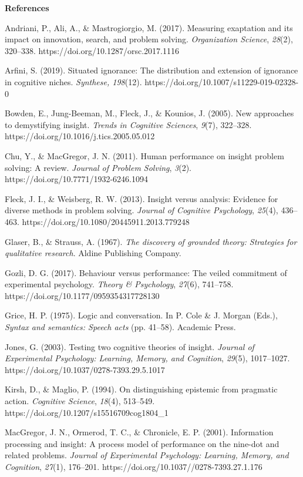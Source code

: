 \documentclass{article}
\begin{document}
\textbf{}

\textbf{References}

Andriani, P., Ali, A., \& Mastrogiorgio, M. (2017). Measuring exaptation and its impact on innovation, search, and problem solving. \emph{Organization Science}, \emph{28}(2), 320--338. https://doi.org/10.1287/orsc.2017.1116

Arfini, S. (2019). Situated ignorance: The distribution and extension of ignorance in cognitive niches. \emph{Synthese, 198}(12). https://doi.org/10.1007/s11229-019-02328-0

Bowden, E., Jung-Beeman, M., Fleck, J., \& Kounios, J. (2005). New approaches to demystifying insight. \emph{Trends in Cognitive Sciences}, \emph{9}(7), 322--328. https://doi.org/10.1016/j.tics.2005.05.012

Chu, Y., \& MacGregor, J. N. (2011). Human performance on insight problem solving: A review. \emph{Journal of Problem Solving}, \emph{3}(2). https://doi.org/10.7771/1932-6246.1094

Fleck, J. I., \& Weisberg, R. W. (2013). Insight versus analysis: Evidence for diverse methods in problem solving. \emph{Journal of Cognitive Psychology}, \emph{25}(4), 436--463. https://doi.org/10.1080/20445911.2013.779248

Glaser, B., \& Strauss, A. (1967). \emph{The discovery of grounded theory: Strategies for qualitative research}. Aldine Publishing Company.

Gozli, D. G. (2017). Behaviour versus performance: The veiled commitment of experimental psychology. \emph{Theory \& Psychology}, \emph{27}(6), 741--758. https://doi.org/10.1177/0959354317728130

Grice, H. P. (1975). Logic and conversation. In P. Cole \& J. Morgan (Eds.), \emph{Syntax and semantics: Speech acts} (pp. 41--58). Academic Press.

Jones, G. (2003). Testing two cognitive theories of insight. \emph{Journal of Experimental Psychology: Learning, Memory, and Cognition}, \emph{29}(5), 1017--1027. https://doi.org/10.1037/0278-7393.29.5.1017

Kirsh, D., \& Maglio, P. (1994). On distinguishing epistemic from pragmatic action. \emph{Cognitive Science}, \emph{18}(4), 513--549. https://doi.org/10.1207/s15516709cog1804\_1

MacGregor, J. N., Ormerod, T. C., \& Chronicle, E. P. (2001). Information processing and insight: A process model of performance on the nine-dot and related problems. \emph{Journal of Experimental Psychology: Learning, Memory, and Cognition}, \emph{27}(1), 176--201. https://doi.org/10.1037//0278-7393.27.1.176
\end{document}

